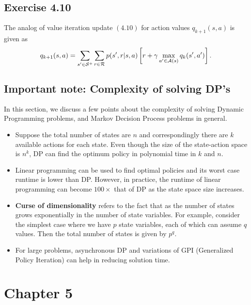 \documentclass[10pt]{article}
\begin{document}
 	\subsection*{Exercise 4.10}
 	\label{ss:4.10}
 	The analog of value iteration update $(4.10)$ for action values $q_{k+1}(s,a)$ is given as
 	\begin{align*}
 	q_{k+1}(s,a) = \sum_{s'\in\mathcal{S}^+}\sum_{r\in\mathcal{R}} p(s',r|s,a) \left[ r + \gamma \max\limits_{a'\in\mathcal{A}(s)} q_k(s',a') \right].
 	\end{align*}
 	\subsection*{Important note: Complexity of solving DP's}
 	\label{ss:dp-complexity}
 	In this section, we discuss a few points about the complexity of solving Dynamic Programming problems, and Markov Decision Process problems in general.
 	\begin{itemize}
 		\item Suppose the total number of states are $n$ and correspondingly there are $k$ available actions for each state. Even though the size of the state-action space is $n^k$, DP can find the optimum policy in polynomial time in $k$ and $n$.
 		\item Linear programming can be used to find optimal policies and its worst case runtime is lower than DP. However, in practice, the runtime of linear programming can become $100\times$ that of DP as the state space size increases.
 		\item \textbf{Curse of dimensionality} refers to the fact that as the number of states grows exponentially in the number of state variables. For example, consider the simplest case where we have $p$ state variables, each of which can assume $q$ values. Then the total number of states is given by $p^q$.
 		\item For large problems, asynchronous DP and variations of GPI (Generalized Policy Iteration) can help in reducing solution time.
 	\end{itemize}
 	\newpage
 	\section{Chapter 5}
\end{document}
